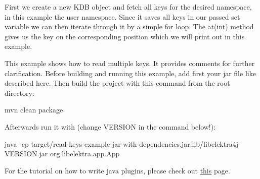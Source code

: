 First we create a new {\ttfamily K\+DB} object and fetch all keys for the desired namespace, in this example the {\ttfamily user} namespace. Since it saves all keys in our passed {\ttfamily set} variable we can then iterate through it by a simple for loop. The {\ttfamily at(int)} method gives us the key on the corresponding position which we will print out in this example.

This example shows how to read multiple keys. It provides comments for further clarification. Before building and running this example, add first your jar file like described here. Then build the project with this command from the root directory\+:


\begin{DoxyCode}
mvn clean package
\end{DoxyCode}


Afterwards run it with (change V\+E\+R\+S\+I\+ON in the command below!)\+:


\begin{DoxyCode}
java -cp target/read-keys-example-jar-with-dependencies.jar:lib/libelektra4j-VERSION.jar
       org.libelektra.app.App
\end{DoxyCode}


For the tutorial on how to write java plugins, please check out \hyperlink{doc_tutorials_java-plugins_md}{this} page. 